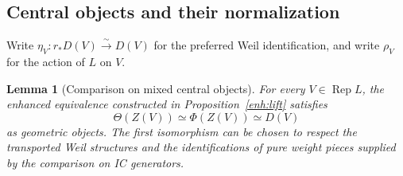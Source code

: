 \documentclass[11pt]{article}
\numberwithin{equation}{section}
\newtheorem{lemma}[theorem]{Lemma}
\theoremstyle{definition}
\theoremstyle{remark}
\newcommand{\Rep}{\operatorname{Rep}}
\begin{document}
\subsection{Central objects and their normalization}
\label{enh:central-comparison}

Write $\eta_V:r_*D(V)\xrightarrow{\sim}D(V)$ for the preferred Weil
identification, and write $\rho_V$ for the action of $L$ on $V$.

\begin{lemma}[Comparison on mixed central objects]
\label{enh:mixed-central-comparison}
For every $V\in\Rep L$, the enhanced equivalence constructed in
Proposition~\ref{enh:lift} satisfies
\[
 \Theta(Z(V))\simeq\Phi(Z(V))\simeq D(V)
\]
as geometric objects.  The first isomorphism can be chosen to respect
the transported Weil structures and the identifications of pure weight
pieces supplied by the comparison on IC generators.
\end{lemma}
\end{document}
